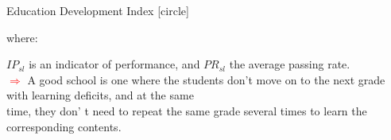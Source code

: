 \documentclass{beamer}
\begin{document}
\begin{frame}[label=IDESP]{Education Development Index}
[circle]
\begin{flushleft} \hspace{9pt}
{\scriptsize where:}
\end{flushleft}
\vspace{-10pt}
\begin{itemize}
{\scriptsize\item $IP_{sl}$ is an indicator of performance, and $PR_{sl}$ the average passing rate.
\\ \tiny\textcolor{red}{$\Longrightarrow$} A good school is one where the students don't move on to the next grade with learning deficits, and at the same \vspace{-8pt} \\ time, they don' t need to repeat the same grade several times to learn the corresponding contents.}
\end{itemize}
\end{frame}
\end{document}
